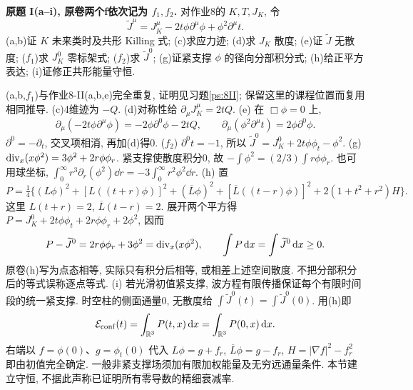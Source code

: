 \begin{exercise}\label{ps:bonus}
\textbf{原题 I(a--i), 原卷两个f依次记为 $f_1,f_2$.} 对作业8的 $K,T,J_K$, 令
\[
\widetilde J^\mu=J_K^\mu-2t\phi\partial^\mu\phi+\phi^2\partial^\mu t.
\]
(a,b)证 $K$ 未来类时及共形 Killing 式; (c)求应力迹; (d)求 $J_K$ 散度; (e)证 $\widetilde J$ 无散度; ($f_1$)求 $J_K^0$ 零标架式; ($f_2$)求 $\widetilde J^0$; (g)证紧支撑 $\phi$ 的径向分部积分式; (h)给正平方表达; (i)证修正共形能量守恒.
\end{exercise}
\begin{solution}
(a,b,$f_1$)与作业8-II(a,b,e)完全重复, 证明见习题\ref{ps:8II}; 保留这里的课程位置而复用相同推导.
(c)4维迹为 $-Q$.
(d)对称性给 $\partial_\mu J_K^\mu=2tQ$.
(e) 在 $\Box\phi=0$ 上,
\[
\partial_\mu(-2t\phi\partial^\mu\phi)=-2\phi\partial^0\phi-2tQ,
\qquad \partial_\mu(\phi^2\partial^\mu t)=2\phi\partial^0\phi.
\]
$\partial^0=-\partial_t$, 交叉项相消, 再加(d)得0.
($f_2$) $\partial^0t=-1$, 所以 $\widetilde J^0=J_K^0+2t\phi\phi_t-\phi^2$.
(g) $\operatorname{div}_x(x\phi^2)=3\phi^2+2r\phi\phi_r$. 紧支撑使散度积分0, 故 $-\int\phi^2=(2/3)\int r\phi\phi_r$. 也可用球坐标, $\int_0^\infty r^3\partial_r(\phi^2)\dd r=-3\int_0^\infty r^2\phi^2\dd r$.
(h) 置
\[
P=\tfrac14\{(L\phi)^2+[L((t+r)\phi)]^2+(\overline L\phi)^2
+[\overline L((t-r)\phi)]^2+2(1+t^2+r^2)H\}.
\]
这里 $L(t+r)=2$, $\overline L(t-r)=2$. 展开两个平方得 $P=J_K^0+2t\phi\phi_t+2r\phi\phi_r+2\phi^2$, 因而
\[
P-\widetilde J^0=2r\phi\phi_r+3\phi^2=\operatorname{div}_x(x\phi^2),\qquad
\int P\,\mathrm d x=\int\widetilde J^0\,\mathrm d x\ge0.
\]
原卷(h)写为点态相等, 实际只有积分后相等, 或相差上述空间散度. 不把分部积分后的等式误称逐点等式.
(i) 若光滑初值紧支撑, 波方程有限传播保证每个有限时间段的统一紧支撑. 时空柱的侧面通量0, 无散度给 $\int\widetilde J^0(t)=\int\widetilde J^0(0)$. 用(h)即
\[
\mathcal E_{\rm conf}(t)=\int_{\mathbb R^3}P(t,x)\,\mathrm d x=\int_{\mathbb R^3}P(0,x)\,\mathrm d x.
\]
右端以 $f=\phi(0)$、$g=\phi_t(0)$ 代入 $L\phi=g+f_r$, $\overline L\phi=g-f_r$, $H=|\nabla f|^2-f_r^2$ 即由初值完全确定. 一般非紧支撑场须加有限加权能量及无穷远通量条件. 本节建立守恒, 不据此声称已证明所有零导数的精细衰减率.
\end{solution}
